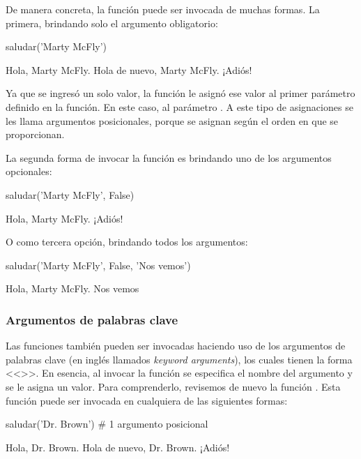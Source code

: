 De manera concreta, la función  puede ser invocada de muchas formas. La primera, brindando solo el argumento obligatorio:

\begin{pyin}
saludar('Marty McFly')
\end{pyin}
\begin{pyprint}
Hola, Marty McFly.
Hola de nuevo, Marty McFly.
¡Adiós!
\end{pyprint}

Ya que se ingresó un solo valor, la función le asignó ese valor al primer parámetro definido en la función. En este caso, al parámetro . A este tipo de asignaciones se les llama argumentos posicionales, porque se asignan según el orden en que se proporcionan.

La segunda forma de invocar la función es brindando uno de los argumentos opcionales:
\begin{pyin}
saludar('Marty McFly', False)
\end{pyin}
\begin{pyprint}
Hola, Marty McFly.
¡Adiós!
\end{pyprint}

O como tercera opción, brindando todos los argumentos:
\begin{pyin}
 saludar('Marty McFly', False, 'Nos vemos')   
\end{pyin}
\begin{pyprint}
Hola, Marty McFly.
Nos vemos
\end{pyprint}

\subsubsection{Argumentos de palabras clave}
Las funciones también pueden ser invocadas haciendo uso de los argumentos de palabras clave (en inglés llamados \emph{keyword arguments}), los cuales tienen la forma <<>>. En esencia, al invocar la función se especifica el nombre del argumento y se le asigna un valor. Para comprenderlo, revisemos de nuevo la función . Esta función puede ser invocada en cualquiera de las siguientes formas:

\begin{pyin}
saludar('Dr. Brown')        # 1 argumento posicional
\end{pyin}
\begin{pyprint}
Hola, Dr. Brown.
Hola de nuevo, Dr. Brown.
¡Adiós!
\end{pyprint}

